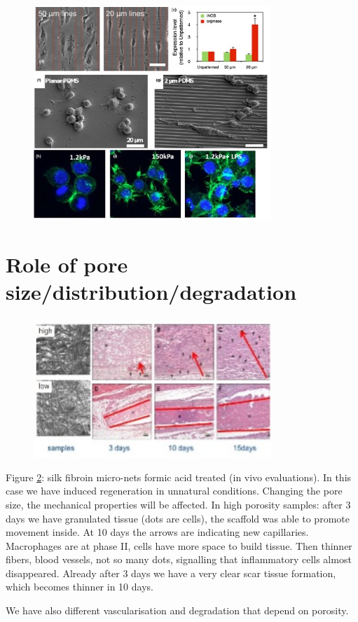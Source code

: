 \begin{figure}[ht]
\includegraphics[width=0.8\textwidth]{topo}
\caption{\label{fig:topo}}
\end{figure}

\section{Role of pore size/distribution/degradation}
\begin{figure}[ht]
\includegraphics[width=0.8\textwidth]{silk}
\caption{\label{fig:silk}}
\end{figure}

Figure \ref{fig:silk}: silk fibroin micro-nets formic acid treated (in vivo evaluations). 
In this case we have induced regeneration in unnatural conditions. 
Changing the pore size, the mechanical properties will be affected. In high porosity samples: after 3 days we have granulated tissue (dots are cells), the scaffold was able to promote movement inside. 
At 10 days the arrows are indicating new capillaries. 
Macrophages are at phase II, cells have more space to build tissue. 
Then thinner fibers, blood vessels, not so many dots, signalling that inflammatory cells almost disappeared. 
Already after 3 days we have a very clear scar tissue formation, which becomes thinner in 10 days. 

We have also different vascularisation and degradation that depend on porosity.
